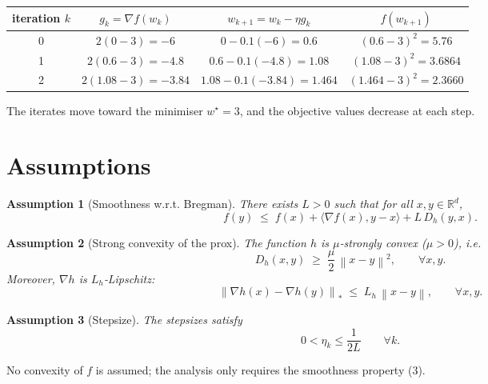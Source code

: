 \documentclass{article}
\newtheorem{assumption}{Assumption}
\newcommand{\norm}[1]{\left\lVert#1\right\rVert}
\newcommand{\dualnorm}[1]{\left\lVert#1\right\rVert_{*}}
\newcommand{\inner}[2]{\langle #1,#2\rangle}
\newcommand{\D}[2]{D_{h}(#1,#2)}
\begin{document}
\begin{center}
\begin{tabular}{c|c|c|c}
iteration $k$ & $g_k=\nabla f(w_k)$ & $w_{k+1}=w_k-\eta g_k$ & $f(w_{k+1})$\\\hline
0 & $2(0-3)=-6$ & $0-0.1(-6)=0.6$ & $(0.6-3)^2=5.76$\\
1 & $2(0.6-3)=-4.8$ & $0.6-0.1(-4.8)=1.08$ & $(1.08-3)^2=3.6864$\\
2 & $2(1.08-3)=-3.84$ & $1.08-0.1(-3.84)=1.464$ & $(1.464-3)^2=2.3660$
\end{tabular}
\end{center}
The iterates move toward the minimiser $w^\star=3$, and the objective
values decrease at each step.

\section*{Assumptions}
\begin{assumption}[Smoothness w.r.t. Bregman]\label{ass:smooth}
There exists $L>0$ such that for all $x,y\in\mathbb{R}^d$,
\[
f(y)\;\le\;f(x)+\inner{\nabla f(x)}{y-x}+L\,\D{y}{x}.
\tag{3}
\]
\end{assumption}

\begin{assumption}[Strong convexity of the prox]\label{ass:strong}
The function $h$ is $\mu$‑strongly convex ($\mu>0$), i.e.
\[
\D{x}{y}\;\ge\;\frac{\mu}{2}\,\norm{x-y}^2,
\qquad\forall x,y.
\tag{4}
\]
Moreover, $\nabla h$ is $L_h$‑Lipschitz:
\[
\dualnorm{\nabla h(x)-\nabla h(y)}\;\le\;L_h\,\norm{x-y},
\qquad\forall x,y.
\tag{5}
\]
\end{assumption}

\begin{assumption}[Stepsize]\label{ass:step}
The stepsizes satisfy 
\[
0<\eta_k\le\frac{1}{2L}\qquad\forall k .
\tag{6}
\]
\end{assumption}

No convexity of $f$ is assumed; the analysis only requires the
smoothness property (3).

\end{document}
